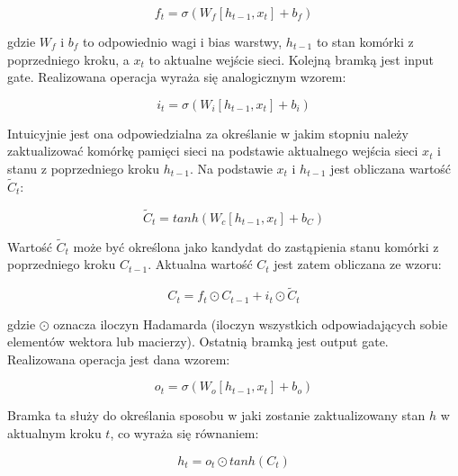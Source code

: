\documentclass[oneside, mag]{mgr}
\begin{document}
\begin{equation}
	f_t = \sigma( W_f [ h_{t-1}, x_t ] + b_f )
\end{equation}

gdzie $W_f$ i $b_f$ to odpowiednio wagi i bias warstwy, $h_{t-1}$ to stan komórki z poprzedniego kroku, a $x_t$ to aktualne wejście sieci. Kolejną bramką jest input gate. Realizowana operacja wyraża się analogicznym wzorem:

\begin{equation}
	i_t = \sigma( W_i [ h_{t-1}, x_t ] + b_i )
\end{equation}

Intuicyjnie jest ona odpowiedzialna za określanie w jakim stopniu należy zaktualizować komórkę pamięci sieci na podstawie aktualnego wejścia sieci $x_t$ i stanu z poprzedniego kroku $h_{t-1}$. Na podstawie $x_t$ i $h_{t-1}$ jest obliczana wartość $\tilde{C}_t$:

\begin{equation}
	\tilde{C}_t = tanh( W_c [ h_{t-1}, x_t ] + b_C )
\end{equation}

Wartość $\tilde{C}_t$ może być określona jako kandydat do zastąpienia stanu komórki z poprzedniego kroku $C_{t-1}$. Aktualna wartość $C_t$ jest zatem obliczana ze wzoru:

\begin{equation}
	C_t = f_t \odot C_{t-1} + i_t \odot \tilde{C}_t
\end{equation}

gdzie $\odot$ oznacza iloczyn Hadamarda (iloczyn wszystkich odpowiadających sobie elementów wektora lub macierzy). Ostatnią bramką jest output gate. Realizowana operacja jest dana wzorem:

\begin{equation}
	o_t = \sigma( W_o [ h_{t-1}, x_t ] + b_o )
\end{equation}

Bramka ta służy do określania sposobu w jaki zostanie zaktualizowany stan $h$ w aktualnym kroku $t$, co wyraża się równaniem:

\begin{equation}
	h_t = o_t \odot tanh( C_t )
\end{equation}
\end{document}
